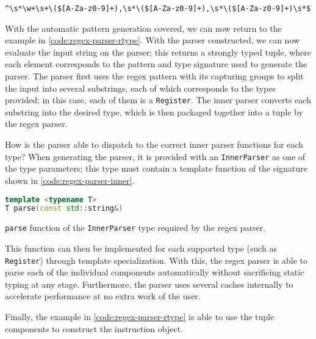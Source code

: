 \texttt{\^{}\textbackslash s*\textbackslash w+\textbackslash s+\textbackslash (\$[A-Za-z0-9]+),\textbackslash s*\textbackslash (\$[A-Za-z0-9]+),\textbackslash s*\textbackslash (\$[A-Za-z0-9]+)\textbackslash s*\$}

With the automatic pattern generation covered, we can now return to the example in \autoref{code:regex-parser-rtype}. With the parser constructed, we can now evaluate the input string on the parser; this returns a strongly typed tuple, where each element corresponds to the pattern and type signature used to generate the parser. The parser first uses the regex pattern with its capturing groups to split the input into several substrings, each of which corresponds to the types provided; in this case, each of them is a \texttt{Register}. The inner parser converts each substring into the desired type, which is then packaged together into a tuple by the regex parser.

How is the parser able to dispatch to the correct inner parser functions for each type? When generating the parser, it is provided with an \texttt{InnerParser} as one of the type parameters; this type must contain a template function of the signature shown in \autoref{code:regex-parser-inner}.

\begin{lstfloat}[H]
    \begin{lstlisting}[language=c++]
template <typename T>
T parse(const std::string&)
    \end{lstlisting}
    \caption{\texttt{parse} function of the \texttt{InnerParser} type required by the regex parser.}
    \label{code:regex-parser-inner}
\end{lstfloat}

This function can then be implemented for each supported type (such as \texttt{Register}) through template specialization. With this, the regex parser is able to parse each of the individual components automatically without sacrificing static typing at any stage. Furthermore, the parser uses several caches internally to accelerate performance at no extra work of the user.

Finally, the example in \autoref{code:regex-parser-rtype} is able to use the tuple components to construct the instruction object.